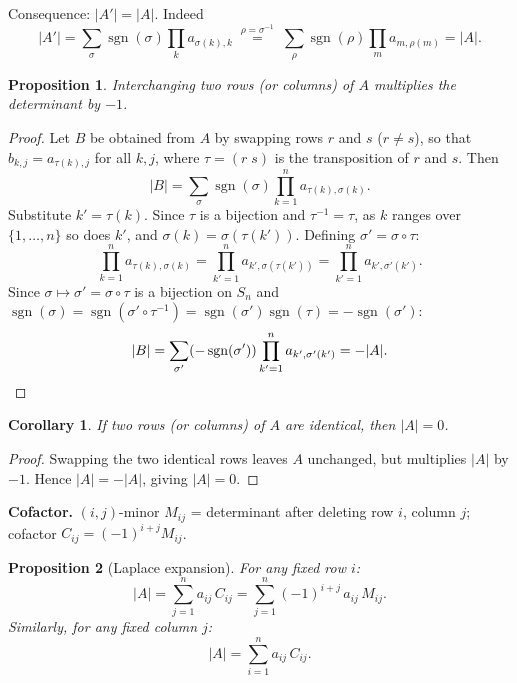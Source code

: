 \documentclass[14pt]{extarticle}
\theoremstyle{plain}
\newtheorem{corollary}[theorem]{Corollary}
\newtheorem{proposition}{Proposition}
\theoremstyle{definition}
\theoremstyle{remark}
\begin{document}
Consequence: $|A'| = |A|$. Indeed
\[
|A'| = \sum_{\sigma} \operatorname{sgn}(\sigma) \prod_{k} a_{\sigma(k),k}
\;\stackrel{\rho=\sigma^{-1}}{=}\; \sum_{\rho} \operatorname{sgn}(\rho) \prod_{m} a_{m,\rho(m)} = |A|.
\]

\begin{proposition}\label{prp:row_swap}
Interchanging two rows (or columns) of $A$ multiplies the determinant by $-1$.
\end{proposition}

\begin{proof}
Let $B$ be obtained from $A$ by swapping rows $r$ and $s$ ($r \neq s$), so that $b_{k,j} = a_{\tau(k),j}$ for all $k, j$, where $\tau = (r\; s)$ is the transposition of $r$ and $s$. Then
\[
|B| = \sum_{\sigma} \operatorname{sgn}(\sigma) \prod_{k=1}^n a_{\tau(k),\sigma(k)}.
\]
Substitute $k' = \tau(k)$. Since $\tau$ is a bijection and $\tau^{-1} = \tau$, as $k$ ranges over $\{1, \dots, n\}$ so does $k'$, and $\sigma(k) = \sigma(\tau(k'))$. Defining $\sigma' = \sigma \circ \tau$:
\[
\prod_{k=1}^n a_{\tau(k),\sigma(k)} = \prod_{k'=1}^n a_{k',\sigma(\tau(k'))} = \prod_{k'=1}^n a_{k',\sigma'(k')}.
\]
Since $\sigma \mapsto \sigma' = \sigma \circ \tau$ is a bijection on $S_n$ and $\operatorname{sgn}(\sigma) = \operatorname{sgn}(\sigma' \circ \tau^{-1}) = \operatorname{sgn}(\sigma')\operatorname{sgn}(\tau) = -\operatorname{sgn}(\sigma')$:
\[
|B| = \sum_{\sigma'} (-\operatorname{sgn}(\sigma')) \prod_{k'=1}^n a_{k',\sigma'(k')} = -|A|. \qedhere
\]
\end{proof}

\begin{corollary}\label{cor:identical_rows}
If two rows (or columns) of $A$ are identical, then $|A| = 0$.
\end{corollary}

\begin{proof}
Swapping the two identical rows leaves $A$ unchanged, but multiplies $|A|$ by $-1$. Hence $|A| = -|A|$, giving $|A| = 0$.
\end{proof}

\textbf{Cofactor.} $(i,j)$-minor $M_{ij}$ = determinant after deleting row $i$, column $j$; cofactor $C_{ij} = (-1)^{i+j} M_{ij}$.

\begin{proposition}[Laplace expansion]\label{prp:laplace}
For any fixed row $i$:
\begin{equation}\label{eq:laplace_row}
|A| = \sum_{j=1}^{n} a_{ij}\, C_{ij} = \sum_{j=1}^{n} (-1)^{i+j}\, a_{ij}\, M_{ij}.
\end{equation}
Similarly, for any fixed column $j$:
\begin{equation}\label{eq:laplace_col}
|A| = \sum_{i=1}^{n} a_{ij}\, C_{ij}.
\end{equation}
\end{proposition}
\end{document}
